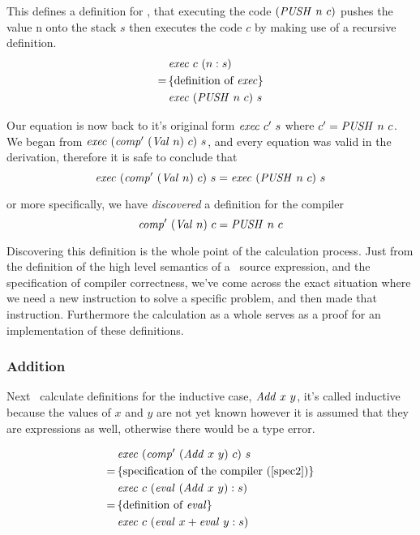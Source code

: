\documentclass {article}
\begin{document}
This defines a definition for \exec, 
that executing the code \( (\mathit{PUSH\ } n\ c) \) 
pushes the value n onto the stack $s$
then executes the code $c$ by making use of 
a recursive definition.
\begin{align*}
&\mathit{exec\ } c\ (n:s) \\
=\, & \{\mbox{definition of \textit{exec}}\} \\
&\mathit{exec\ }  (\mathit{PUSH\ } n\ c)\ s
\end{align*}

Our equation is now back to it's original form $\mathit{exec\ } c'\ s$
where $c' = \mathit{PUSH\ } n\ c$. We began from 
\(\mathit{exec\ } (\mathit{comp'\ } (\mathit{Val\ } n)\ c)\ s \),
and every equation was valid in the derivation,
therefore it is safe to conclude that 
\begin{equation*}
\mathit{exec\ } (\mathit{comp'\ } (\mathit{Val\ }  n)\ c)\ s = \mathit{exec\ }  (\mathit{PUSH\ } n\ c)\ s 
\end{equation*}

\noindent or more specifically, we have \emph{discovered} 
a definition for the compiler
\begin{equation}
\mathit{comp'\ }  (\mathit{Val\ } n)\ c =  \mathit{PUSH\ } n\ c \label{compval}
\end{equation}

Discovering this definition is the 
whole point of the calculation process.
Just from the definition of the high level semantics 
of a \val\ source expression, and the specification 
of compiler correctness, we've come across the
exact situation where we need a new instruction
to solve a specific problem,
and then made that instruction. 
Furthermore the calculation as a whole
serves as a proof for an implementation
of these definitions.

\subsubsection{Addition} \label{addsec}

Next \BH\ calculate definitions for the inductive case, 
$\mathit{Add\ } x\ y$,
it's called inductive because  
the values of $x$ and $y$ are not yet known
however it is assumed
that they are expressions as well,
otherwise there would be a type error.

\begin{align*}
&\mathit{exec\ } (\mathit{comp'\ }  (\mathit{Add\ } x\ y)\ c)\ s \\
=\, & \{ \mbox{specification of the compiler (\ref{spec2})} \} \\
&\mathit{exec\ } c\ (\mathit{eval\ } (\mathit{Add\ } x\ y) : s) \\
=\, & \{ \mbox{definition of \textit{eval}} \} \\
&\mathit{exec\ } c\ (\mathit{eval\ } x + \mathit{eval\ } y :s)
\end{align*}
\end{document}
